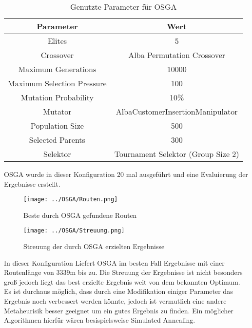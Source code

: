 \documentclass{IEEEtran}
\begin{document}
\begin{table}
    \renewcommand{\arraystretch}{1.3}
    \caption{Genutzte Parameter für OSGA}
    \label{OSGA_table}
    \centering
    \begin{tabular}{c||c}
    \hline
    \bfseries  Parameter & \bfseries  Wert \\
    \hline\hline\hline
 
    Elites                     & 5                                  \\
    Crossover                  & Alba Permutation Crossover         \\
    Maximum Generations        & 10000                              \\
    Maximum Selection Pressure & 100                                \\
    Mutation Probability       & 10\%                               \\
    Mutator                    & AlbaCustomerInsertionManipulator   \\
    Population Size            & 500                                \\
    Selected Parents           & 300                                \\
    Selektor                   & Tournament Selektor (Group Size 2) \\
    \hline
    \end{tabular}
 \end{table}

OSGA wurde in dieser Konfiguration 20 mal ausgeführt und eine Evaluierung der Ergebnisse erstellt.

\begin{figure}
    \centering
    \texttt{[image: ../OSGA/Routen.png]}
    \caption{Beste durch OSGA gefundene Routen}
    \label{paths}
\end{figure}

\begin{figure}
    \centering
    \texttt{[image: ../OSGA/Streuung.png]}
    \caption{Streuung der durch OSGA erzielten Ergebnisse}
    \label{box}
\end{figure}

In dieser Konfiguration Liefert OSGA im besten Fall Ergebnisse mit einer Routenlänge von 3339m bis zu. 
Die Streuung der Ergebnisse ist nicht besonders groß jedoch liegt das best erzielte Ergebnis weit von dem bekannten Optimum.
Es ist durchaus möglich, dass durch eine Modifikation einiger Parameter das Ergebnis noch verbessert werden könnte, jedoch ist vermutlich eine andere Metaheurisik besser geeignet um ein gutes Ergebnis zu finden.
Ein möglicher Algorithmen hierfür wären besispielsweise Simulated Annealing.
\end{document}
